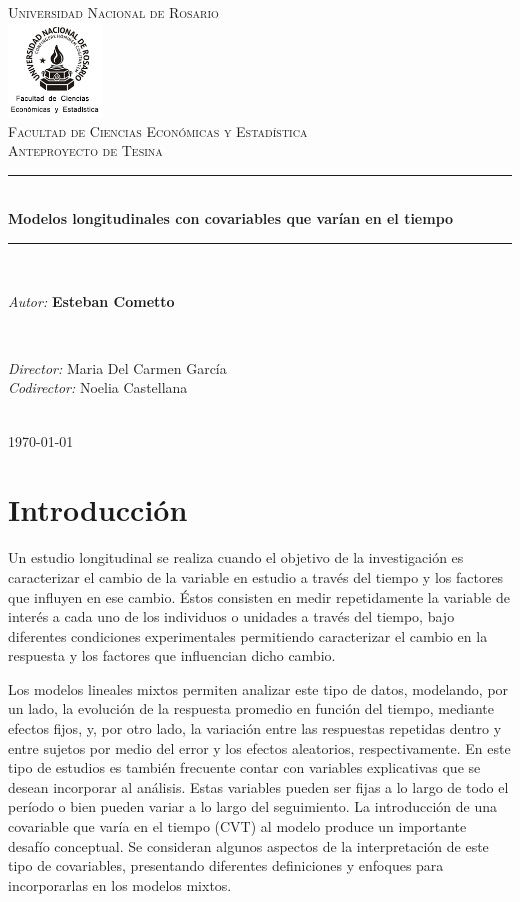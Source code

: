 \documentclass[12pt]{article}
\title{\thesistitle}
\author{\thesisauthorfirst\space\thesisauthorsecond}
\date{\thesisdate}
\def\thesistitle{Modelos longitudinales con covariables que varían en el tiempo}
\def\thesisauthorfirst{\textbf{Esteban Cometto}}
\def\thesissupervisorfirst{Maria Del Carmen García}
\def\thesissupervisorsecond{Noelia Castellana}
\def\thesisdate{\today}
\def\cvt{covariable que varía en el tiempo}
\begin{document}
\begin{titlepage}
    \newcommand{\HRule}{\rule{\linewidth}{0.5mm}}
	\center
	\textsc{\Large Universidad Nacional de Rosario}\\[.7cm]
	\includegraphics[width=25mm]{img/fceye-unr.png}\\[.5cm]
	\textsc{Facultad de Ciencias Económicas y Estadística}\\[0.5cm]
	\textsc{Anteproyecto de Tesina}
	
	\HRule \\[0.4cm]
	{ \huge \bfseries \thesistitle}\\[0.1cm]
	\HRule \\[.5cm]
	
	\begin{minipage}{0.6\textwidth}
	\large
	\emph{Autor:}	\thesisauthorfirst
	\end{minipage}
	\\[.6cm]
	\begin{minipage}{0.6\textwidth}
	\emph{Director:} 	\thesissupervisorfirst \\[.2cm]
	\emph{Codirector:} 	\thesissupervisorsecond
	\end{minipage}
	\\[4cm]
	\vfill
	{\large \thesisdate}\\
	\clearpage
\end{titlepage}

\newpage
\tableofcontents

\newpage
\section{Introducción}

Un estudio longitudinal se realiza cuando el objetivo de la investigación es caracterizar
el cambio de la variable en estudio a través del tiempo y los factores que influyen en ese
cambio. Éstos consisten en medir repetidamente la variable de interés a cada uno de los
individuos o unidades a través del tiempo, bajo diferentes condiciones experimentales permitiendo
caracterizar  el  cambio  en  la respuesta y los factores que influencian dicho cambio.

Los modelos lineales mixtos permiten analizar este tipo de datos, modelando, por un lado, la evolución de la respuesta promedio en
función del tiempo, mediante efectos fijos, y, por otro lado, la variación entre las respuestas repetidas dentro y entre
sujetos por medio del error y los efectos aleatorios, respectivamente. En este tipo de estudios es también frecuente contar
con variables explicativas que se desean incorporar al análisis. Estas variables pueden ser fijas a lo largo de todo el
período o bien pueden variar a lo largo del seguimiento. La introducción de una \cvt{} (CVT) al
modelo produce un importante desafío conceptual. Se consideran algunos aspectos de la interpretación de este tipo de
covariables, presentando diferentes definiciones y enfoques para incorporarlas en los modelos mixtos.
\end{document}
